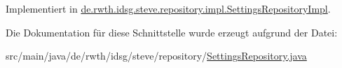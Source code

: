 Implementiert in \hyperlink{classde_1_1rwth_1_1idsg_1_1steve_1_1repository_1_1impl_1_1_settings_repository_impl_afa3ed87dc4194aaceeb52bcba1ec447f}{de.\-rwth.\-idsg.\-steve.\-repository.\-impl.\-Settings\-Repository\-Impl}.



Die Dokumentation für diese Schnittstelle wurde erzeugt aufgrund der Datei\-:\begin{DoxyCompactItemize}
\item 
src/main/java/de/rwth/idsg/steve/repository/\hyperlink{_settings_repository_8java}{Settings\-Repository.\-java}\end{DoxyCompactItemize}
